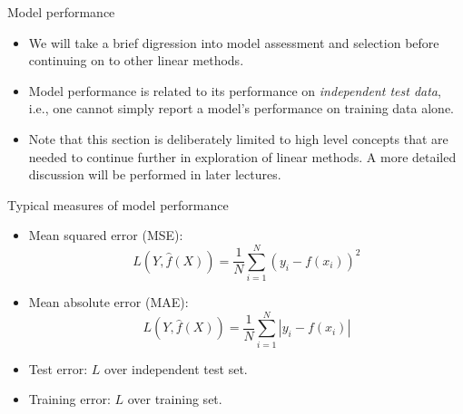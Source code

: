 \documentclass{beamer}
\begin{document}
\begin{frame}{Model performance}
    \begin{itemize}
        \item We will take a brief digression into model assessment and selection before continuing on to other linear methods.
        \item Model performance is related to its performance on \textit{independent test data}, i.e., one cannot simply report a model's performance on training data alone.
        \item Note that this section is deliberately limited to high level concepts that are needed to continue further in exploration of linear methods. A more detailed discussion will be performed in later lectures.
    \end{itemize}
\end{frame} 


\begin{frame}{Typical measures of model performance}
    \begin{itemize}
        \item Mean squared error (MSE):
            \begin{equation*}
                L(Y, \hat{f}(X)) = \frac{1}{N}\sum_{i=1}^N (y_i - f(x_i))^2
            \end{equation*}
        \item Mean absolute error (MAE):
            \begin{equation*}
                L(Y, \hat{f}(X)) = \frac{1}{N}\sum_{i=1}^N \left| y_i - f(x_i) \right|
            \end{equation*}
        \item Test error: $L$ over independent test set.
        \item Training error: $L$ over training set.
    \end{itemize}
\end{frame}
\end{document}
